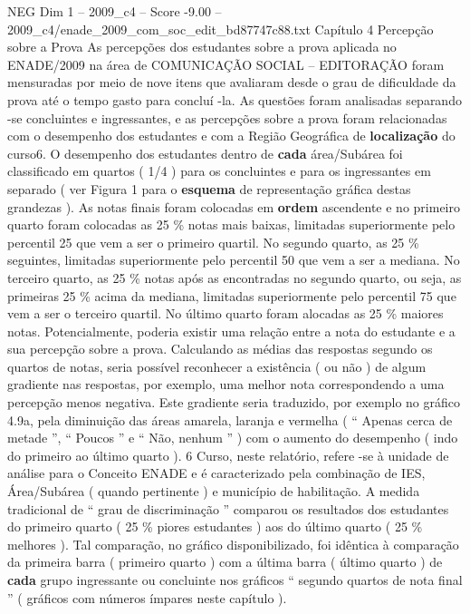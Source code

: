 \begin{textsample}{NEG Dim 1 – 2009\_c4 – Score -9.00 – 2009\_c4/enade\_2009\_com\_soc\_edit\_bd87747c88.txt}  \label{ex:f1_neg_023}
Capítulo 4 Percepção sobre a Prova As percepções dos estudantes sobre a prova aplicada no ENADE/2009 na área de COMUNICAÇÃO SOCIAL – EDITORAÇÃO foram mensuradas por meio de nove itens que avaliaram desde o grau de dificuldade da prova até o tempo gasto para concluí -la.
As questões foram analisadas separando -se concluintes e ingressantes, e as percepções sobre a prova foram relacionadas com o desempenho dos estudantes e com a Região Geográfica de \textbf{localização} do curso6.
O desempenho dos estudantes dentro de \textbf{cada} área/Subárea foi classificado em quartos ( 1/4 ) para os concluintes e para os ingressantes em separado ( ver Figura 1 para o \textbf{esquema} de representação gráfica destas grandezas ).
As notas finais foram colocadas em \textbf{ordem} ascendente e no primeiro quarto foram colocadas as 25 \% notas mais baixas, limitadas superiormente pelo percentil 25 que vem a ser o primeiro quartil.
No segundo quarto, as 25 \% seguintes, limitadas superiormente pelo percentil 50 que vem a ser a mediana.
No terceiro quarto, as 25 \% notas após as encontradas no segundo quarto, ou seja, as primeiras 25 \% acima da mediana, limitadas superiormente pelo percentil 75 que vem a ser o terceiro quartil.
No último quarto foram alocadas as 25 \% maiores notas.
Potencialmente, poderia existir uma relação entre a nota do estudante e a sua percepção sobre a prova.
Calculando as médias das respostas segundo os quartos de notas, seria possível reconhecer a existência ( ou não ) de algum gradiente nas respostas, por exemplo, uma melhor nota correspondendo a uma percepção menos negativa.
Este gradiente seria traduzido, por exemplo no gráfico 4.9a, pela diminuição das áreas amarela, laranja e vermelha ( “ Apenas cerca de metade ”, “ Poucos ” e “ Não, nenhum ” ) com o aumento do desempenho ( indo do primeiro ao último quarto ). 6 Curso, neste relatório, refere -se à unidade de análise para o Conceito ENADE e é caracterizado pela combinação de IES, Área/Subárea ( quando pertinente ) e município de habilitação.
A medida tradicional de “ grau de discriminação ” comparou os resultados dos estudantes do primeiro quarto ( 25 \% piores estudantes ) aos do último quarto ( 25 \% melhores ).
Tal comparação, no gráfico disponibilizado, foi idêntica à comparação da primeira barra ( primeiro quarto ) com a última barra ( último quarto ) de \textbf{cada} grupo ingressante ou concluinte nos gráficos “ segundo quartos de nota final ” ( gráficos com números ímpares neste capítulo ).

\end{textsample}
